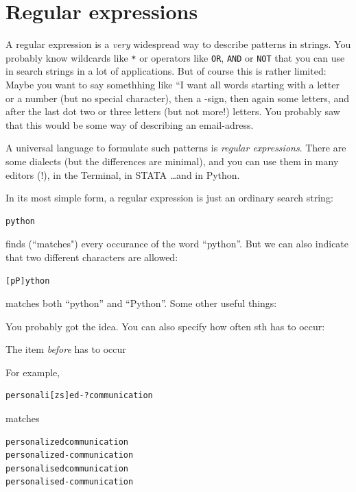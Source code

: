\documentclass[a4paper,12pt]{book}
\renewcommand{\texttt}[1]{%
  \begingroup
  \ttfamily
  \begingroup\lccode`~=`/\lowercase{\endgroup\def~}{/\discretionary{}{}{}}%
  \begingroup\lccode`~=`[\lowercase{\endgroup\def~}{[\discretionary{}{}{}}%
  \begingroup\lccode`~=`.\lowercase{\endgroup\def~}{.\discretionary{}{}{}}%
  \begingroup\lccode`~=`(\lowercase{\endgroup\def~}{(\discretionary{}{}{}}%
  \catcode`/=\active\catcode`[=\active\catcode`.=\active\catcode`(=\active
  \scantokens{#1\noexpand}%
  \endgroup
}
\begin{document}
\section{Regular expressions}
\label{sec:regexp}

A regular expression is a \emph{very} widespread way to describe patterns in strings. You probably know wildcards like {\tt{*}} or operators like {\tt{OR}}, {\tt{AND}} or {\tt{NOT}} that you can use in search strings in a lot of applications. But of course this is rather limited: Maybe you want to say somethhing like ``I want all words starting with a letter or a number (but no special character), then a \@-sign, then again some letters, and after the last dot two or three letters (but not more!) letters. You probably saw that this would be some way of describing an email-adress. 

A universal language to formulate such patterns is \emph{regular expressions}. There are some dialects (but the differences are minimal), and you can use them in many editors (!), in the Terminal, in STATA \ldots and in Python.

In its most simple form, a regular expression is just an ordinary search string:
\begin{lstlisting}
python
\end{lstlisting}
finds (``matches") every occurance of the word ``python''. But we can also indicate that two different characters are allowed:
\begin{lstlisting}
[pP]ython
\end{lstlisting}
matches both ``python'' and ``Python''. Some other useful things:


You probably got the idea. You can also specify how often sth has to occur:

The item \emph{before} has to occur
For example,
\begin{lstlisting}
personali[zs]ed-?communication
\end{lstlisting}
matches 
\begin{lstlisting}
personalizedcommunication
personalized-communication
personalisedcommunication
personalised-communication
\end{lstlisting}
\end{document}
